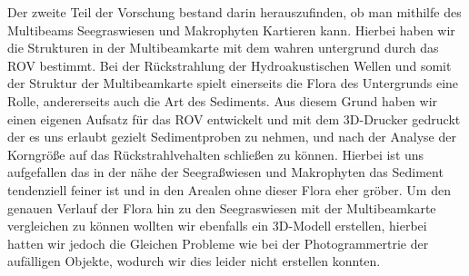 Der zweite Teil der Vorschung bestand darin herauszufinden, ob man mithilfe des Multibeams Seegraswiesen und Makrophyten Kartieren kann. Hierbei haben wir die Strukturen in der Multibeamkarte mit dem wahren untergrund durch das ROV bestimmt.
Bei der Rückstrahlung der Hydroakustischen Wellen und somit der Struktur der Multibeamkarte spielt einerseits die Flora des Untergrunds eine Rolle, andererseits auch die Art des Sediments.
Aus diesem Grund haben wir einen eigenen Aufsatz für das ROV entwickelt und mit dem 3D-Drucker gedruckt der es uns erlaubt gezielt Sedimentproben zu nehmen, und nach der Analyse der Korngröße auf das Rückstrahlvehalten schließen zu können.
Hierbei ist uns aufgefallen das in der nähe der Seegraßwiesen und Makrophyten das Sediment tendenziell feiner ist und in den Arealen ohne dieser Flora eher gröber.
Um den genauen Verlauf der Flora hin zu den Seegraswiesen mit der Multibeamkarte vergleichen zu können wollten wir ebenfalls ein 3D-Modell erstellen, hierbei hatten wir jedoch die Gleichen Probleme wie bei der Photogrammertrie der aufälligen Objekte, wodurch wir dies leider nicht erstellen konnten.
